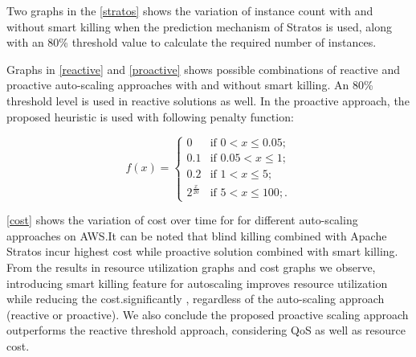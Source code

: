 Two graphs in the \ref{stratos} shows the variation of instance count with and without smart killing when the prediction mechanism of Stratos is used, along with an 80\% threshold value to calculate the required number of instances.

Graphs in \ref{reactive}  and \ref{proactive} shows possible combinations of reactive and proactive auto-scaling approaches with and without smart killing. An 80\% threshold level is used in reactive solutions as well. In the proactive approach, the proposed heuristic is used with following penalty function:

$$f(x) = \begin{cases} 
0 & \text{if $0 < x \le 0.05$}; \\
0.1 & \text{if $0.05 < x \le 1$}; \\
0.2 & \text{if $1 < x \le 5$};\\
2^{\frac{x}{20}} & \text{if $5 < x \le 100$};.\end{cases} $$


\ref{cost} shows the variation of cost over time for for different auto-scaling approaches on AWS.It can be noted that blind killing combined with Apache Stratos incur highest cost while proactive solution combined with smart killing.\\

From the results in resource utilization graphs and cost graphs we observe, introducing smart killing feature for autoscaling  improves resource utilization while reducing the cost.significantly , regardless of the auto-scaling approach (reactive or proactive). We also conclude the proposed proactive scaling approach outperforms the reactive threshold approach, considering QoS as well as resource cost.